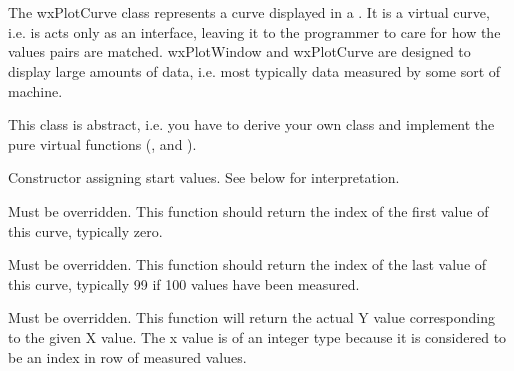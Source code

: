 %
%

\section{}\label{wxplotcurve}

The wxPlotCurve class represents a curve displayed in a . It
is a virtual curve, i.e. is acts only as an interface, leaving it to the programmer to care for
how the values pairs are matched. wxPlotWindow and wxPlotCurve are designed to display large
amounts of data, i.e. most typically data measured by some sort of machine.

This class is abstract, i.e. you have to derive your own class and implement the pure
virtual functions (, 
and ).




\label{wxplotcurvewxplotcurve}


Constructor assigning start values. See below for interpretation.

\label{wxplotcurvegetstartx}


Must be overridden. This function should return the index of the first value
of this curve, typically zero.

\label{wxplotcurvegetendx}


Must be overridden. This function should return the index of the last value
of this curve, typically 99 if 100 values have been measured.

\label{wxplotcurvegety}


Must be overridden. This function will return the actual Y value corresponding
to the given X value. The x value is of an integer type because it is considered
to be an index in row of measured values.

